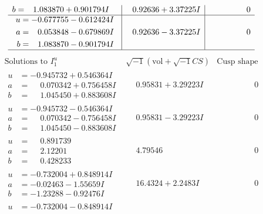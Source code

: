 \documentclass[1p]{elsarticle_modified}
\theoremstyle{definition}
\newcommand{\I}{\sqrt{-1}}
\begin{document}
$$\begin{array}{c|c|c}
\begin{aligned}
b &= \phantom{-}1.083870 + 0.901794 I\end{aligned}
 & \phantom{-}0.92636 + 3.37225 I & \phantom{-0.000000 } 0 \\ \hline\begin{aligned}
u &= -0.677755 - 0.612424 I \\
a &= \phantom{-}0.053848 - 0.679869 I \\
b &= \phantom{-}1.083870 - 0.901794 I\end{aligned}
 & \phantom{-}0.92636 - 3.37225 I & \phantom{-0.000000 } 0\\
 \hline 
 \end{array}$$\newpage$$\begin{array}{c|c|c}  
\text{Solutions to }I^u_{1}& \I (\text{vol} + \sqrt{-1}CS) & \text{Cusp shape}\\
 \hline 
\begin{aligned}
u &= -0.945732 + 0.546364 I \\
a &= \phantom{-}0.070342 + 0.756458 I \\
b &= \phantom{-}1.045450 + 0.883608 I\end{aligned}
 & \phantom{-}0.95831 + 3.29223 I & \phantom{-0.000000 } 0 \\ \hline\begin{aligned}
u &= -0.945732 - 0.546364 I \\
a &= \phantom{-}0.070342 - 0.756458 I \\
b &= \phantom{-}1.045450 - 0.883608 I\end{aligned}
 & \phantom{-}0.95831 - 3.29223 I & \phantom{-0.000000 } 0 \\ \hline\begin{aligned}
u &= \phantom{-}0.891739\phantom{ +0.000000I} \\
a &= \phantom{-}2.12201\phantom{ +0.000000I} \\
b &= \phantom{-}0.428233\phantom{ +0.000000I}\end{aligned}
 & \phantom{-}4.79546\phantom{ +0.000000I} & \phantom{-0.000000 } 0 \\ \hline\begin{aligned}
u &= -0.732004 + 0.848914 I \\
a &= -0.02463 - 1.55659 I \\
b &= -1.23288 - 0.92476 I\end{aligned}
 & \phantom{-}16.4324 + 2.2483 I & \phantom{-0.000000 } 0 \\ \hline\begin{aligned}
u &= -0.732004 - 0.848914 I \\

\end{aligned}
\end{array}$$
\end{document}
